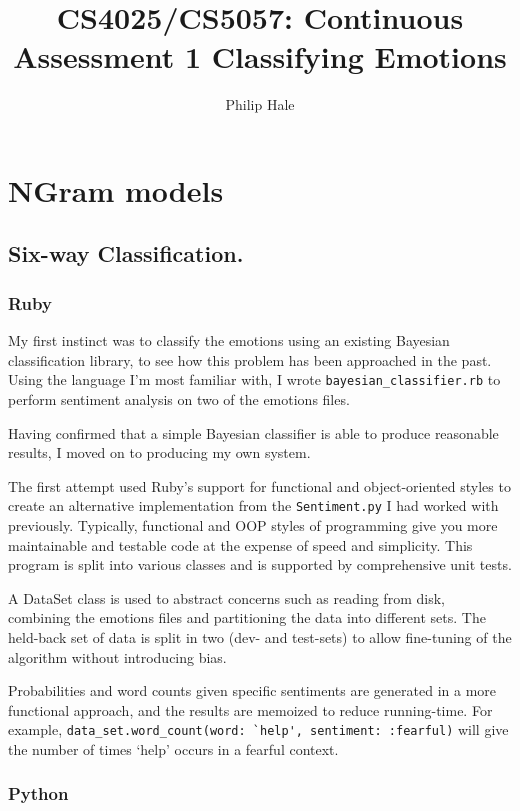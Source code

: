 \documentclass[a4paper,oneside]{article}
\author{Philip Hale}
\title{CS4025/CS5057: Continuous Assessment 1 Classifying Emotions}
\begin{document}
\maketitle

\tableofcontents

\section{NGram models}

\subsection{Six-way Classification.}

\subsubsection{Ruby}

My first instinct was to classify the emotions using an existing Bayesian
classification library, to see how this problem has been approached in the
past.  Using the language I'm most familiar with, I wrote
\verb!bayesian_classifier.rb!  to perform sentiment analysis on two of the
emotions files.

Having confirmed that a simple Bayesian classifier is able to produce
reasonable results, I moved on to producing my own system.

The first attempt used Ruby's support for functional and object-oriented styles
to create an alternative implementation from the \verb!Sentiment.py! I had
worked with previously.  Typically, functional and OOP styles of programming
give you more maintainable and testable code at the expense of speed and
simplicity.  This program is split into various classes and is supported by
comprehensive unit tests.

A DataSet class is used to abstract concerns such as reading from disk,
combining the emotions files and partitioning the data into different sets. The
held-back set of data is split in two (dev- and test-sets) to allow fine-tuning
of the algorithm without introducing bias.

Probabilities and word counts given specific sentiments are generated in a more
functional approach, and the results are memoized to reduce running-time.  For
example, \verb!data_set.word_count(word: `help', sentiment: :fearful)! will
give the number of times `help' occurs in a fearful context.

\subsubsection{Python}
\end{document}
